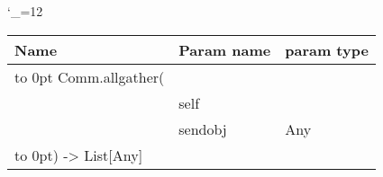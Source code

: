 \begingroup \catcode`\_=12 \tt
\begin{tabular}{lll}
\toprule
\textrm{Name}&\textrm{Param name}&\textrm{param type}\\
\midrule
\hbox to 0pt {Comm.allgather(\hss}\\
& self\\
& sendobj & Any\\
\hbox to 0pt{) -> List[Any]\hss}\\
\bottomrule
\end{tabular}
\endgroup
